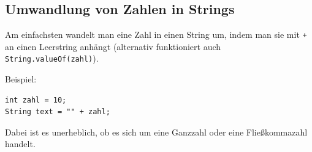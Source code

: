 \subsection{Umwandlung von Zahlen in Strings}

Am einfachsten wandelt man eine Zahl in einen String um, indem man sie mit
\verb|+| an einen Leerstring anhängt (alternativ funktioniert auch
\verb|String.valueOf(zahl)|).

Beispiel:

\begin{lstlisting}
int zahl = 10;
String text = "" + zahl;
\end{lstlisting}

Dabei ist es unerheblich, ob es sich um eine Ganzzahl oder eine Fließkommazahl
handelt.

